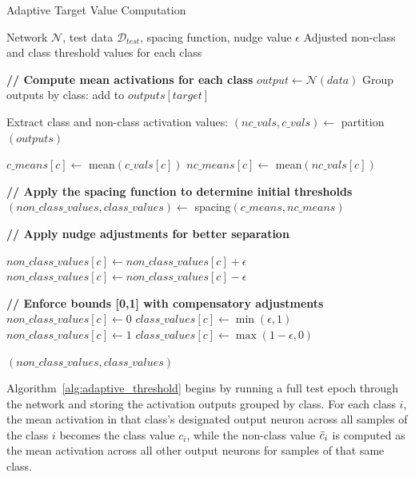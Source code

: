 \documentclass[12pt,fleqn,a4paper]{article}
\begin{document}
\begin{algorithm}
\caption{Adaptive Target Value Computation}
\label{alg:adaptive_threshold}
\begin{algorithmic}[1]
\REQUIRE Network $\mathcal{N}$, test data $\mathcal{D}_{test}$, spacing function, nudge value $\epsilon$
\ENSURE Adjusted non-class and class threshold values for each class

\STATE \textbf{// Compute mean activations for each class}
    \STATE $output \leftarrow \mathcal{N}(data)$
    \STATE Group outputs by class: add to $outputs[target]$
\ENDFOR

\STATE Extract class and non-class activation values: $(nc\_vals, c\_vals) \leftarrow$ partition$(outputs)$

    \STATE $c\_means[c] \leftarrow$ mean$(c\_vals[c])$
    \STATE $nc\_means[c] \leftarrow$ mean$(nc\_vals[c])$
\ENDFOR

\STATE \textbf{// Apply the spacing function to determine initial thresholds}
\STATE $(non\_class\_values, class\_values) \leftarrow$ spacing$(c\_means, nc\_means)$

\STATE \textbf{// Apply nudge adjustments for better separation}

        \STATE $non\_class\_values[c] \leftarrow non\_class\_values[c] + \epsilon$
    \ELSE
        \STATE $non\_class\_values[c] \leftarrow non\_class\_values[c] - \epsilon$
    \ENDIF
    
    \STATE \textbf{// Enforce bounds [0,1] with compensatory adjustments}
        \STATE $non\_class\_values[c] \leftarrow 0$
        \STATE $class\_values[c] \leftarrow \min(\epsilon, 1)$
        \STATE $non\_class\_values[c] \leftarrow 1$
        \STATE $class\_values[c] \leftarrow \max(1 - \epsilon, 0)$
    \ENDIF
\ENDFOR

\RETURN $(non\_class\_values, class\_values)$
\end{algorithmic}
\end{algorithm}

Algorithm~\ref{alg:adaptive_threshold} begins by running a full test epoch through the network and storing the activation outputs grouped by class. For each class $i$, the mean activation in that class's designated output neuron across all samples of the class $i$ becomes the class value $c_i$, while the non-class value $\Bar{c}_i$ is computed as the mean activation across all other output neurons for samples of that same class.
\end{document}
